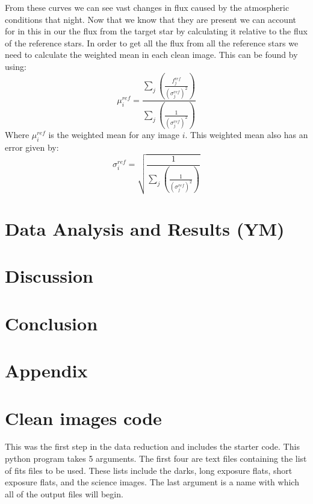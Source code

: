 \documentclass{aastex}
\begin{document}
From these curves we can see vast changes in flux caused by the atmospheric conditions that night. Now that we know that they are present we can account for in this in our the flux from the target star by calculating it relative to the flux of the reference stars. In order to get all the flux from all the reference stars we need to calculate the weighted mean in each clean image. This can be found by using:
\begin{equation}
	\mu_{i}^{ref} = \frac{\sum_{j}\left( \frac{f_{j}^{ref}}{\left( \sigma_{j}^{ref}\right) ^{2}}\right) }{\sum_{j}\left( \frac{1}{\left( \sigma_{j}^{ref}\right) ^{2}}\right) }
\end{equation}
Where $\mu_{i}^{ref}$ is the weighted mean for any image $i$. This weighted mean also has an error given by:
\begin{equation}
	\sigma_{i}^{ref} = \sqrt{\frac{1}{\sum_{j}\left( \frac{1}{\left( \sigma_{j}^{ref}\right) ^{2}}\right)}}
\end{equation}

\section{Data Analysis and Results (YM)}
\section{Discussion}
\section{Conclusion}
\begin{thebibliography}{9}
	
\end{thebibliography}

\section{Appendix}
\appendix
\section{Clean images code} \label{code: reduction}
This was the first step in the data reduction and includes the starter code. This python program takes 5 arguments. The first four are text files containing the list of fits files to be used. These lists include the darks, long exposure flats, short exposure flats, and the science images. The last argument is a name with which all of the output files will begin. 
\end{document}
